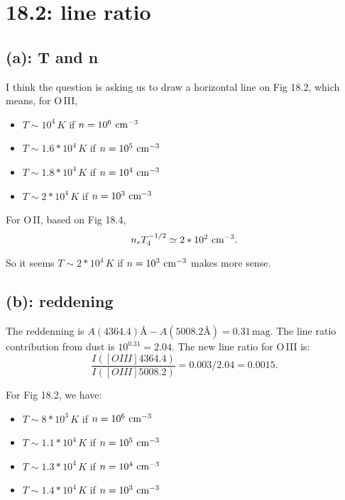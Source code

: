 \documentclass[12pt,letterpaper]{article}
\newcommand{\cm}{\textrm{\,cm}}
\begin{document}
\section*{18.2: line ratio}

\subsection*{(a): T and n}
I think the question is asking us to draw a horizontal line on Fig 18.2, which means, for O\,III, 
\begin{itemize}
    \item $ T\sim 10^4 \, K $ if $ n = 10^6 \, \cm^{-3} $
    \item $ T\sim 1.6 * 10^4 \, K $ if $ n = 10^5 \, \cm^{-3} $
    \item $ T\sim 1.8 * 10^4 \, K $ if $ n = 10^4 \, \cm^{-3} $
    \item $ T\sim 2 * 10^4 \, K $ if $ n = 10^3 \, \cm^{-3} $
\end{itemize}

For O\,II, based on Fig 18.4, 
\begin{equation}
    n_e T_4^{-1/2} \simeq 2 * 10^2 \,\cm^{-3}.
\end{equation}

So it seems $ T\sim 2 * 10^4 \, K $ if $ n = 10^3 \, \cm^{-3} $ makes more sense.

\subsection*{(b): reddening}

The reddenning is $ A(4364.4) \textrm{\AA} - A(5008.2\textrm{\AA}) = 0.31 \, \textrm{mag} $.
The line ratio contribution from dust is $10^{0.31} = 2.04$.
The new line ratio for O\,III is:
\begin{equation}
    \frac{I([OIII]4364.4)}{I([OIII] 5008.2 )}
    = 0.003 / 2.04 = 0.0015.
\end{equation}

For Fig 18.2, we have:
\begin{itemize}
    \item $ T\sim 8 * 10^3 \, K $ if $ n = 10^6 \, \cm^{-3} $
    \item $ T\sim 1.1 * 10^4 \, K $ if $ n = 10^5 \, \cm^{-3} $
    \item $ T\sim 1.3 * 10^4 \, K $ if $ n = 10^4 \, \cm^{-3} $
    \item $ T\sim 1.4 * 10^4 \, K $ if $ n = 10^3 \, \cm^{-3} $
\end{itemize}
\end{document}
